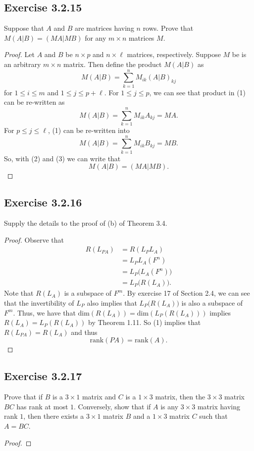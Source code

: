 \subsection*{Exercise 3.2.15} Suppose that \( A   \) and \( B  \) are matrices having \( n  \) rows. Prove that \( M(A|B) = (MA|MB) \) for any \( m \times n  \) matrices \( M  \).
\begin{proof}
Let \( A  \) and \( B  \) be \( n \times p  \) and \( n \times \ell  \) matrices, respectively. Suppose \( M  \) be is an arbitrary \( m \times n  \) matrix. Then define the product \( M (A | B ) \) as 
\[  M (A|B) = \sum_{ k =1  }^{ n  } {M}_{ik } (A | B)_{kj} \tag{1} \]
for \( 1 \leq i \leq m  \) and \( 1 \leq j \leq  p + \ell  \). For \( 1 \leq j \leq p  \), we can see that product in (1) can be re-written as
\[  M (A|B) = \sum_{ k= 1  }^{ n } {M}_{ik } {A}_{kj} = MA. \tag{2} \]
For \( p \leq j \leq \ell  \), (1) can be re-written into
\[  M (A|B) = \sum_{ k=1  }^{ n } {M}_{ik } {B}_{kj} = MB. \tag{3} \]
So, with (2) and (3) we can write that
\[  M (A|B) = (MA | MB). \]
\end{proof}

\subsection*{Exercise 3.2.16} Supply the details to the proof of (b) of Theorem 3.4.
\begin{proof}
Observe that
\begin{align*}
   R({L}_{PA}) &= R({L}_{P} {L}_{A}) \\
               &=  {L}_{P} {L}_{A}(F^{n}) \\
               &= {L}_{P} \Big( {L}_{A} (F^{n}) \Big) \\
               &= {L}_{P} \Big(  R( {L}_{A}) \Big). \tag{1}
\end{align*}
Note that \( R({L}_{A})  \) is a subspace of \( F^{m} \). By exercise 17 of Section 2.4, we can see that the invertibility of \( {L}_{P} \) also implies that \( {L}_{P}\Big(R({L}_{A})\Big) \) is also a subspace of \( F^{m} \). Thus, we have that \( \text{dim}(R({L}_{A})) = \text{dim}({L}_{P}({R}({L}_{A}))) \) implies \( R({L}_{A}) = {L}_{P}(R({L}_{A})) \) by Theorem 1.11. So (1) implies that \( R({L}_{PA}) = R({L}_{A})   \) and thus \[ \text{rank}(PA) = \text{rank}(A). \]
\end{proof}

\subsection*{Exercise 3.2.17} Prove that if \( B  \) is a \( 3 \times 1  \) matrix and \( C  \) is a \( 1 \times 3 \) matrix, then the \( 3 \times 3 \) matrix \( BC  \) has rank at most \( 1  \). Conversely, show that if \( A  \) is any \( 3 \times 3  \) matrix having rank \( 1  \), then there exists a \( 3 \times 1  \) matrix \( B  \) and a \( 1 \times 3  \) matrix \( C  \) such that \( A = BC  \).
\begin{proof}

\end{proof}

